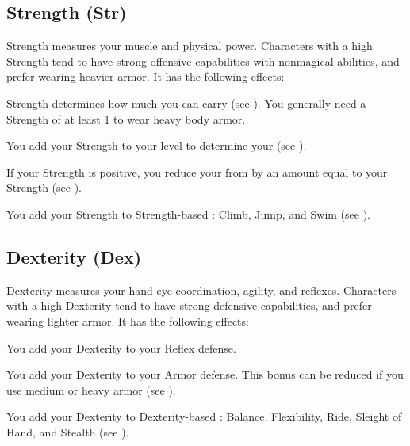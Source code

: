     \subsection{Strength (Str)}\label{Strength}
        {
            Strength measures your muscle and physical power.
            Characters with a high Strength tend to have strong offensive capabilities with nonmagical abilities, and prefer wearing heavier armor.
            It has the following effects:
            \begin{raggeditemize}
                \item Strength determines how much you can carry (see ).
                    You generally need a Strength of at least 1 to wear heavy body armor.
                \item You add your Strength to your level to determine your  (see ).
                \item If your Strength is positive, you reduce your  from  by an amount equal to your Strength (see ).
                \item You add your Strength to Strength-based : Climb, Jump, and Swim (see ).
            \end{raggeditemize}
        }

    \subsection{Dexterity (Dex)}\label{Dexterity}
        {
            Dexterity measures your hand-eye coordination, agility, and reflexes.
            Characters with a high Dexterity tend to have strong defensive capabilities, and prefer wearing lighter armor.
            It has the following effects:
            \begin{raggeditemize}
                \item You add your Dexterity to your Reflex defense.
                \item You add your Dexterity to your Armor defense.
                    This bonus can be reduced if you use medium or heavy armor (see ).
                \item You add your Dexterity to Dexterity-based : Balance, Flexibility, Ride, Sleight of Hand, and Stealth (see ).
            \end{raggeditemize}
        }

